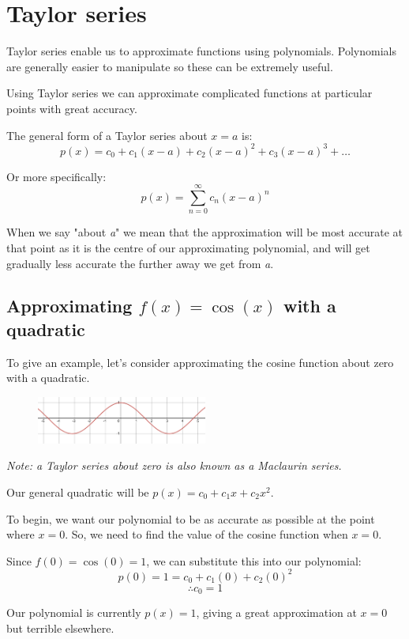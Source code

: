\documentclass[../main.tex]{subfiles}
\begin{document}
\section{Taylor series}
Taylor series enable us to approximate functions using polynomials. Polynomials are generally easier to manipulate so these can be extremely useful.

Using Taylor series we can approximate complicated functions at particular points with great accuracy.

The general form of a Taylor series about $x=a$ is:
\[p(x)=c_0 + c_1(x-a) + c_2(x-a)^2 + c_3(x-a)^3 + \dots\]

Or more specifically:
\[p(x)=\sum\limits_{n=0}^\infty c_n(x-a)^n\]

When we say "about \textit{a}" we mean that the approximation will be most accurate at that point as it is the centre of our approximating polynomial, and will get gradually less accurate the further away we get from \textit{a}.

\subsection*{Approximating $f(x)=\cos{(x)}$ with a quadratic}
To give an example, let's consider approximating the cosine function about zero with a quadratic.

\begin{figure}[h]
    \centering
    \includegraphics[width=0.5\textwidth]{images/taylorseries1.png}
\end{figure}

\textit{Note: a Taylor series about zero is also known as a Maclaurin series.}

Our general quadratic will be $p(x) = c_0 + c_1x + c_2x^2$.

To begin, we want our polynomial to be as accurate as possible at the point where $x=0$. So, we need to find the value of the cosine function when $x=0$. 

Since $f(0)=\cos{(0)}=1$, we can substitute this into our polynomial:
\[p(0) = 1 = c_0+c_1(0)+c_2(0)^2\]
\[\therefore c_0=1\]

Our polynomial is currently $p(x) = 1$, giving a great approximation at $x=0$ but terrible elsewhere.
\end{document}
